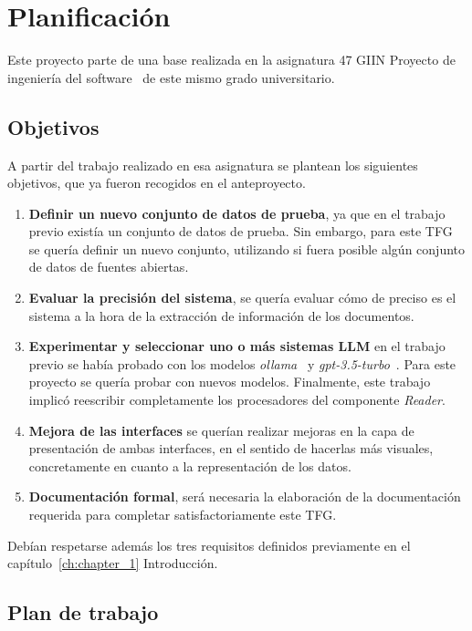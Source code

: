 \section{Planificación}\label{sec:desarrollo_de_software}

Este proyecto parte de una base realizada en la asignatura 47 GIIN Proyecto de ingeniería del
software~\cite{url_viu_47_proyecto} de este mismo grado universitario.

\subsection*{Objetivos}

A partir del trabajo realizado en esa asignatura se plantean los siguientes objetivos, que ya fueron recogidos en el
anteproyecto.

\begin{enumerate}
    \item \textbf{Definir un nuevo conjunto de datos de prueba},
    ya que en el trabajo previo existía un conjunto de datos de prueba.
    Sin embargo, para este TFG se quería definir un nuevo conjunto, utilizando si fuera posible algún conjunto de
    datos de fuentes abiertas.
    \item \textbf{Evaluar la precisión del sistema},
    se quería evaluar cómo de preciso es el sistema a la hora de la extracción de información de los documentos.
    \item \textbf{Experimentar y seleccionar uno o más sistemas LLM}
    en el trabajo previo se había probado con los modelos \textit{ollama}~\cite{url_ollama} y
    \textit{gpt-3.5-turbo}~\cite{url_openai_gpt3_5}.
    Para este proyecto se quería probar con nuevos modelos.
    Finalmente, este trabajo implicó reescribir completamente los procesadores del componente \textit{Reader}.
    \item \textbf{Mejora de las interfaces}
    se querían realizar mejoras en la capa de presentación de ambas interfaces, en el sentido de hacerlas más
    visuales, concretamente en cuanto a la representación de los datos.
    \item \textbf{Documentación formal},
    será necesaria la elaboración de la documentación requerida para completar satisfactoriamente este TFG.
\end{enumerate}

Debían respetarse además los tres requisitos definidos previamente en el capítulo~\ref{ch:chapter_1} Introducción.

\subsection*{Plan de trabajo}

